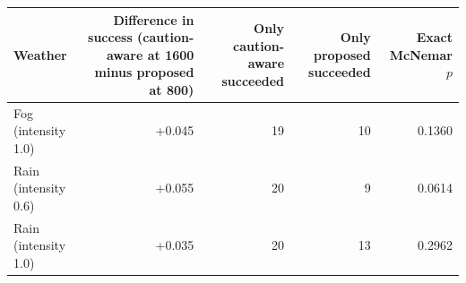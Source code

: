 \begin{tabular}{@{}lrrrr@{}}\toprule
Weather & Difference in success (caution-aware at 1600 minus proposed at 800) & Only caution-aware succeeded & Only proposed succeeded & Exact McNemar $p$\\\midrule
Fog (intensity 1.0) & +0.045 & 19 & 10 & 0.1360\\
Rain (intensity 0.6) & +0.055 & 20 & 9 & 0.0614\\
Rain (intensity 1.0) & +0.035 & 20 & 13 & 0.2962\\
\bottomrule\end{tabular}
